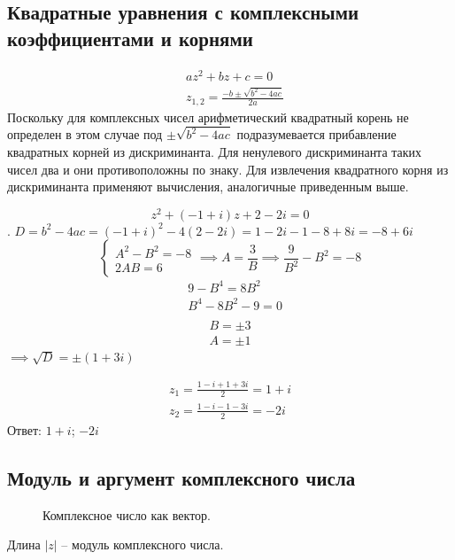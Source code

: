 \documentclass[12pt, a4paper]{article}
\begin{document}
    \subsection{Квадратные уравнения с комплексными коэффициентами и корнями}
    \begin{align*}
        &az^2 + bz + c = 0 \\
        &z_{1, 2} = \frac{-b \pm \sqrt{b^2 - 4ac} }{2a}
    \end{align*}
    Поскольку для комплексных чисел арифметический квадратный корень не определен в этом случае под \( \pm \sqrt{b^2 - 4ac}  \) подразумевается прибавление квадратных корней из дискриминанта. Для ненулевого дискриминанта таких чисел два и они противоположны по знаку. Для извлечения квадратного корня из дискриминанта применяют вычисления, аналогичные приведенным выше.
    \begin{exmp}
        \[
            z^2 + (-1 + i)z + 2 - 2i = 0
        \]. \( D = b^2 - 4ac = (-1 + i)^2 - 4(2 - 2i) = 1 - 2i - 1 -8 + 8i = -8 + 6i \)
        \[
            \begin{cases}
                A^2 - B^2 = -8 \\
                2AB = 6
            \end{cases} \implies A = \frac{3}{B} \implies \frac{9}{B^2} - B^2 = -8
        \] 
        \begin{align*}
            &9 - B^{4}  = 8B^2 \\
            &B^{4} - 8B^2 - 9 = 0\\  
        \end{align*}
        \begin{align*}
            B = \pm 3 \\
            A = \pm 1
        \end{align*} \( \implies \sqrt{D} = \pm(1 + 3i) \)

        \begin{align*}
            z_{1} = \frac{1 - i + 1 + 3i}{2} = 1 + i \\
            z_{2} = \frac{1 - i -1 - 3i}{2} = -2i
        \end{align*}
        Ответ: \( 1 + i \); \( -2i \)
    \end{exmp}
    \subsection{Модуль и аргумент комплексного числа}

    \begin{figure}[htbp]
        \caption{Комплексное число как вектор.}
    \end{figure}
    Длина \( |z| \) -- модуль комплексного числа.
\end{document}
